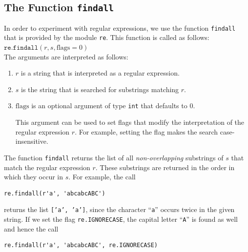\subsection{The Function \texttt{findall}}
In order to experiment with regular expressions, we use the function \texttt{findall} that is provided by the
module \texttt{re}.  This function is called as follows:
\\[0.2cm]
\hspace*{1.3cm}
$\texttt{re.findall}(r, s, \textrm{flags}=0)$
\\[0.2cm]
The arguments are interpreted as follows:
\begin{enumerate}
\item $r$ is a string that is interpreted as a regular expression.
\item $s$ is the string that is searched for substrings matching $r$.
\item $\textrm{flags}$ is an optional argument of type \texttt{int} that defaults to $0$.

      This argument can be used to set flags that modify the interpretation of the regular expression $r$.  For
      example, setting the flag  makes the search case-insensitive.
\end{enumerate}
The function \texttt{findall} returns the list of all \emph{non-overlapping} substrings of $s$ that match the
regular expression $r$.  These substrings are returned in the order in which they occur in $s$.  For example,
the call

\begin{verbatim}
re.findall(r'a', 'abcabcABC')
\end{verbatim}

\noindent
returns the list \texttt{['a', 'a']}, since the character ``\texttt{a}'' occurs twice in the given string.  If
we set the flag \texttt{re.IGNORECASE}, the capital letter ``\texttt{A}'' is found as well and hence the call

\begin{verbatim}
re.findall(r'a', 'abcabcABC', re.IGNORECASE)
\end{verbatim}

